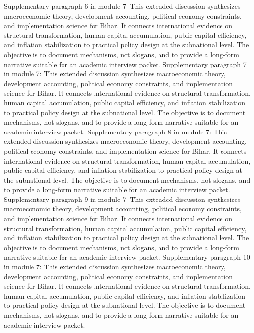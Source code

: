 \documentclass[preprint,12pt]{elsarticle}
\begin{document}
Supplementary paragraph 6 in module 7: This extended discussion synthesizes macroeconomic theory, development accounting, political economy constraints, and implementation science for Bihar. It connects international evidence on structural transformation, human capital accumulation, public capital efficiency, and inflation stabilization to practical policy design at the subnational level. The objective is to document mechanisms, not slogans, and to provide a long-form narrative suitable for an academic interview packet.
Supplementary paragraph 7 in module 7: This extended discussion synthesizes macroeconomic theory, development accounting, political economy constraints, and implementation science for Bihar. It connects international evidence on structural transformation, human capital accumulation, public capital efficiency, and inflation stabilization to practical policy design at the subnational level. The objective is to document mechanisms, not slogans, and to provide a long-form narrative suitable for an academic interview packet.
Supplementary paragraph 8 in module 7: This extended discussion synthesizes macroeconomic theory, development accounting, political economy constraints, and implementation science for Bihar. It connects international evidence on structural transformation, human capital accumulation, public capital efficiency, and inflation stabilization to practical policy design at the subnational level. The objective is to document mechanisms, not slogans, and to provide a long-form narrative suitable for an academic interview packet.
Supplementary paragraph 9 in module 7: This extended discussion synthesizes macroeconomic theory, development accounting, political economy constraints, and implementation science for Bihar. It connects international evidence on structural transformation, human capital accumulation, public capital efficiency, and inflation stabilization to practical policy design at the subnational level. The objective is to document mechanisms, not slogans, and to provide a long-form narrative suitable for an academic interview packet.
Supplementary paragraph 10 in module 7: This extended discussion synthesizes macroeconomic theory, development accounting, political economy constraints, and implementation science for Bihar. It connects international evidence on structural transformation, human capital accumulation, public capital efficiency, and inflation stabilization to practical policy design at the subnational level. The objective is to document mechanisms, not slogans, and to provide a long-form narrative suitable for an academic interview packet.
\end{document}
